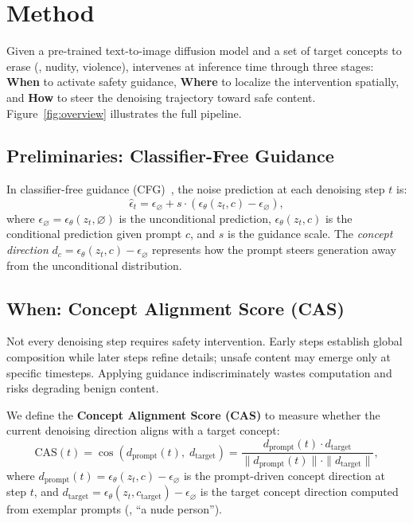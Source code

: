 \section{Method}
\label{sec:method}

Given a pre-trained text-to-image diffusion model and a set of target concepts to erase (\eg, nudity, violence), \ours{} intervenes at inference time through three stages: \textbf{When} to activate safety guidance, \textbf{Where} to localize the intervention spatially, and \textbf{How} to steer the denoising trajectory toward safe content. Figure~\ref{fig:overview} illustrates the full pipeline.

\subsection{Preliminaries: Classifier-Free Guidance}

In classifier-free guidance (CFG)~\citep{ho2021classifier}, the noise prediction at each denoising step $t$ is:
\begin{equation}
    \hat{\epsilon}_t = \epsilon_\varnothing + s \cdot (\epsilon_\theta(z_t, c) - \epsilon_\varnothing),
\end{equation}
where $\epsilon_\varnothing = \epsilon_\theta(z_t, \varnothing)$ is the unconditional prediction, $\epsilon_\theta(z_t, c)$ is the conditional prediction given prompt $c$, and $s$ is the guidance scale. The \emph{concept direction} $d_c = \epsilon_\theta(z_t, c) - \epsilon_\varnothing$ represents how the prompt steers generation away from the unconditional distribution.

\subsection{When: Concept Alignment Score (CAS)}
\label{subsec:when}

Not every denoising step requires safety intervention. Early steps establish global composition while later steps refine details; unsafe content may emerge only at specific timesteps. Applying guidance indiscriminately wastes computation and risks degrading benign content.

We define the \textbf{Concept Alignment Score (CAS)} to measure whether the current denoising direction aligns with a target concept:
\begin{equation}
    \text{CAS}(t) = \cos\left(d_\text{prompt}(t), \; d_\text{target}\right) = \frac{d_\text{prompt}(t) \cdot d_\text{target}}{\|d_\text{prompt}(t)\| \cdot \|d_\text{target}\|},
    \label{eq:cas}
\end{equation}
where $d_\text{prompt}(t) = \epsilon_\theta(z_t, c) - \epsilon_\varnothing$ is the prompt-driven concept direction at step $t$, and $d_\text{target} = \epsilon_\theta(z_t, c_\text{target}) - \epsilon_\varnothing$ is the target concept direction computed from exemplar prompts (\eg, ``a nude person'').

